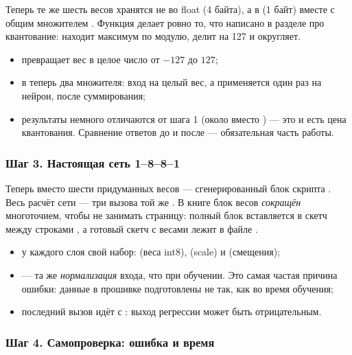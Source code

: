 Теперь те же шесть весов хранятся не во float (4 байта), а в  (1 байт) вместе с общим
множителем . Функция  делает ровно то, что написано в разделе про квантование:
находит максимум по модулю, делит на 127 и округляет.


\begin{itemize}[leftmargin=*]
  \item {} превращает вес в целое число от $-127$ до $127$;
  \item в  теперь два множителя: вход на целый вес, а  применяется один раз
        на нейрон, после суммирования;
  \item результаты немного отличаются от шага 1 (около  вместо ) --- это и есть
        цена квантования. Сравнение ответов до и после --- обязательная часть работы.
\end{itemize}

\subsubsection{Шаг 3. Настоящая сеть 1--8--8--1}

Теперь вместо шести придуманных весов --- сгенерированный блок скрипта . Весь расчёт
сети --- три вызова той же . В книге блок весов \emph{сокращён} многоточием, чтобы не
занимать страницу: полный блок вставляется в скетч между строками , а готовый скетч с весами лежит в файле .


\begin{itemize}[leftmargin=*]
  \item у каждого слоя свой набор:  (веса int8),  (scale) и  (смещения);
  \item {} --- та же \emph{нормализация} входа, что при обучении. Это самая частая причина
        ошибки: данные в прошивке подготовлены не так, как во время обучения;
  \item последний вызов  идёт с : выход регрессии может быть отрицательным.
\end{itemize}

\subsubsection{Шаг 4. Самопроверка: ошибка и время}

